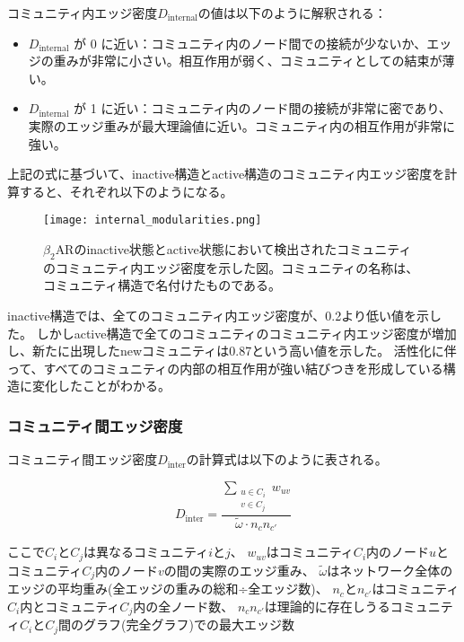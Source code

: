コミュニティ内エッジ密度$D_{\text{internal}}$の値は以下のように解釈される：
\begin{itemize}
    \item \( D_{\text{internal}} \) が 0 に近い：コミュニティ内のノード間での接続が少ないか、エッジの重みが非常に小さい。相互作用が弱く、コミュニティとしての結束が薄い。
    \item \( D_{\text{internal}} \) が 1 に近い：コミュニティ内のノード間の接続が非常に密であり、実際のエッジ重みが最大理論値に近い。コミュニティ内の相互作用が非常に強い。
\end{itemize}

上記の式に基づいて、inactive構造とactive構造のコミュニティ内エッジ密度を計算すると、それぞれ以下のようになる。

\begin{figure}[htbp]
    \centering
    \texttt{[image: internal\_modularities.png]}
    \caption{$\beta_2$ARのinactive状態とactive状態において検出されたコミュニティのコミュニティ内エッジ密度を示した図。コミュニティの名称は、コミュニティ構造で名付けたものである。}
    \label{fig:internal}
\end{figure}

\newpage

inactive構造では、全てのコミュニティ内エッジ密度が、0.2より低い値を示した。
しかしactive構造で全てのコミュニティのコミュニティ内エッジ密度が増加し、新たに出現したnewコミュニティは0.87という高い値を示した。
活性化に伴って、すべてのコミュニティの内部の相互作用が強い結びつきを形成している構造に変化したことがわかる。

\subsubsection{コミュニティ間エッジ密度}
コミュニティ間エッジ密度$D_{\text{inter}}$の計算式は以下のように表される。

\begin{equation}
D_{\text{inter}} = \frac{\sum_{\substack{u \in C_i \\ v \in C_j}} w_{uv}}{\tilde{\omega} \cdot n_c n_{c'}}
\label{eq:inter_density}
\end{equation}


ここで$C_i$と$C_j$は異なるコミュニティ$i$と$j$、
$w_{uv}$はコミュニティ$C_i$内のノード$u$とコミュニティ$C_j$内のノード$v$の間の実際のエッジ重み、
$\tilde{\omega}$はネットワーク全体のエッジの平均重み(全エッジの重みの総和÷全エッジ数)、
$n_c$と$n_{c'}$はコミュニティ$C_i$内とコミュニティ$C_j$内の全ノード数、
$n_c n_{c'}$は理論的に存在しうるコミュニティ$C_i$と$C_j$間のグラフ(完全グラフ)での最大エッジ数

